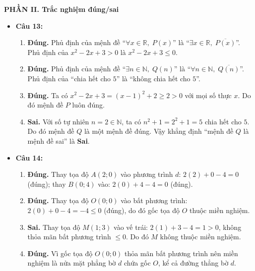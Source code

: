 \documentclass[12pt,a4paper]{article}
\begin{document}
\vspace{0.15cm}
\textbf{\large PHẦN II. Trắc nghiệm đúng/sai}
\begin{itemize}[leftmargin=0.6cm, itemsep=4pt, topsep=1pt]
\item \textbf{Câu 13:}
\begin{enumerate}[label=\alph*), itemsep=1.5pt, topsep=1pt]
    \item \textbf{Đúng.} Phủ định của mệnh đề ``$\forall x \in \mathbb{R},\; P(x)$'' là ``$\exists x \in \mathbb{R},\; \overline{P(x)}$''. Phủ định của $x^2 - 2x + 3 > 0$ là $x^2 - 2x + 3 \le 0$.
    \item \textbf{Đúng.} Phủ định của mệnh đề ``$\exists n \in \mathbb{N},\; Q(n)$'' là ``$\forall n \in \mathbb{N},\; \overline{Q(n)}$''. Phủ định của ``chia hết cho $5$'' là ``không chia hết cho $5$''.
    \item \textbf{Đúng.} Ta có $x^2 - 2x + 3 = (x - 1)^2 + 2 \ge 2 > 0$ với mọi số thực $x$. Do đó mệnh đề $P$ luôn đúng.
    \item \textbf{Sai.} Với số tự nhiên $n = 2 \in \mathbb{N}$, ta có $n^2 + 1 = 2^2 + 1 = 5$ chia hết cho $5$. Do đó mệnh đề $Q$ là một mệnh đề đúng. Vậy khẳng định ``mệnh đề $Q$ là mệnh đề sai'' là \textbf{Sai}.
\end{enumerate}

\item \textbf{Câu 14:}
\begin{enumerate}[label=\alph*), itemsep=1.5pt, topsep=1pt]
    \item \textbf{Đúng.} Thay tọa độ $A(2; 0)$ vào phương trình $d$: $2(2) + 0 - 4 = 0$ (đúng); thay $B(0; 4)$ vào: $2(0) + 4 - 4 = 0$ (đúng).
    \item \textbf{Đúng.} Thay tọa độ $O(0; 0)$ vào bất phương trình: $2(0) + 0 - 4 = -4 \le 0$ (đúng), do đó gốc tọa độ $O$ thuộc miền nghiệm.
    \item \textbf{Sai.} Thay tọa độ $M(1; 3)$ vào vế trái: $2(1) + 3 - 4 = 1 > 0$, không thỏa mãn bất phương trình $\le 0$. Do đó $M$ không thuộc miền nghiệm.
    \item \textbf{Đúng.} Vì gốc tọa độ $O(0; 0)$ thỏa mãn bất phương trình nên miền nghiệm là nửa mặt phẳng bờ $d$ chứa gốc $O$, kể cả đường thẳng bờ $d$.
\end{enumerate}
\end{itemize}
\end{document}
